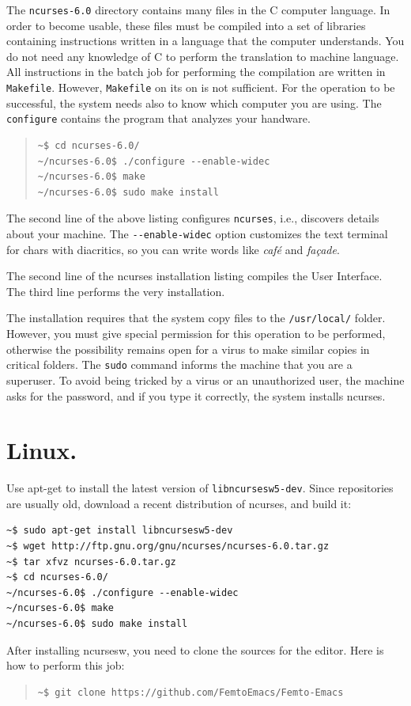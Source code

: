 \documentclass[a4paper,12pt]{book}
\begin{document}
The \verb|ncurses-6.0| directory contains
many files in the C  computer language.
In order to become usable, these files
must be compiled into a set of libraries
containing instructions written in a
language that the computer understands.
You do not need any knowledge of C to
perform the translation to machine
language. All instructions in the
batch job for performing the compilation
are written in  \verb|Makefile|. However,
\verb|Makefile| on its on is not
sufficient. For the operation to be
successful, the system needs also to know which
computer you are using. The \verb|configure|
contains the program that analyzes your
handware.
\begin{quote}
\begin{verbatim}
~$ cd ncurses-6.0/
~/ncurses-6.0$ ./configure --enable-widec
~/ncurses-6.0$ make
~/ncurses-6.0$ sudo make install
\end{verbatim}
\end{quote}
The second line of the above listing
configures \verb|ncurses|, i.e.,
discovers details about your machine.
The \verb|--enable-widec| option customizes
the text terminal for chars with
diacritics, so you can write words
like {\em café} and {\em façade}.

The second line of the ncurses installation
listing compiles the User Interface.
The third line performs the very installation.

The installation requires that the
system copy files to the \verb|/usr/local/|
folder. However, you must give special
permission for this operation to be performed,
otherwise the possibility remains open for
a virus to make similar copies
in critical folders.
The \verb|sudo|
command informs the machine that you
are a superuser. To avoid being tricked
by a virus or an unauthorized user,
the machine asks for the password,
and if you type it correctly,
the system installs ncurses.

\section{Linux.} Use apt-get to install the
latest version of \verb|libncursesw5-dev|.
Since repositories are usually old,
 download a recent distribution of ncurses,
and build it:
\begin{verbatim}
~$ sudo apt-get install libncursesw5-dev
~$ wget http://ftp.gnu.org/gnu/ncurses/ncurses-6.0.tar.gz
~$ tar xfvz ncurses-6.0.tar.gz
~$ cd ncurses-6.0/
~/ncurses-6.0$ ./configure --enable-widec
~/ncurses-6.0$ make
~/ncurses-6.0$ sudo make install
\end{verbatim}
After installing ncursesw,  you need to
clone the sources for the editor. Here is how
to perform this job:
\begin{quote}
\begin{verbatim}
~$ git clone https://github.com/FemtoEmacs/Femto-Emacs
\end{verbatim}
\end{quote}
\end{document}
